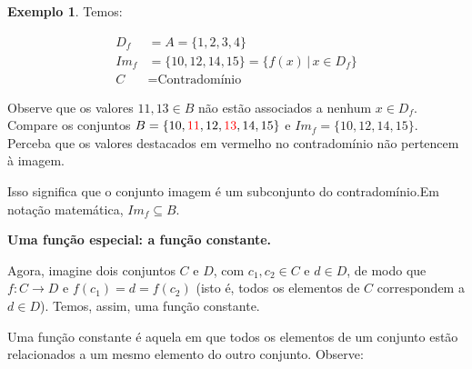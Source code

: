 \documentclass[12pt,openright,twoside,a4paper]{article}
\theoremstyle{definition}
\newtheorem{example}{Exemplo}[section]
\begin{document}
\begin{example}
		Temos:
		
		\begin{align*}
			D_f &= A = \{1,2,3,4\}\\
			Im_f &= \{10, 12, 14, 15\} = \{f(x) \,|\, x \in D_f\} \\
			C &= \text{Contradomínio}			
		\end{align*}
		
		Observe que os valores $11, 13 \in B$ não estão associados a nenhum $x \in D_f$. Compare os conjuntos $B = \{10, \textcolor{red}{11}, 12, \textcolor{red}{13}, 14, 15\}$ e $Im_f = \{10, 12, 14, 15\}$. Perceba que os valores destacados em vermelho no contradomínio não pertencem à imagem.
		
		Isso significa que o conjunto imagem é um subconjunto do contradomínio.Em notação matemática, $Im_f \subseteq B$. 
	\end{example}
	
	\textbf{Uma função especial: a função constante.}
	
	Agora, imagine dois conjuntos $C$ e $D$, com $c_1, c_2 \in C$ e $d \in D$, de modo que $f: C \longrightarrow D$ e $f(c_1) = d = f(c_2)$ (isto é, todos os elementos de $C$ correspondem a $d \in D$). Temos, assim, uma função constante.
	
	Uma função constante é aquela em que todos os elementos de um conjunto estão relacionados a um mesmo elemento do outro conjunto. Observe:
	
\end{document}
